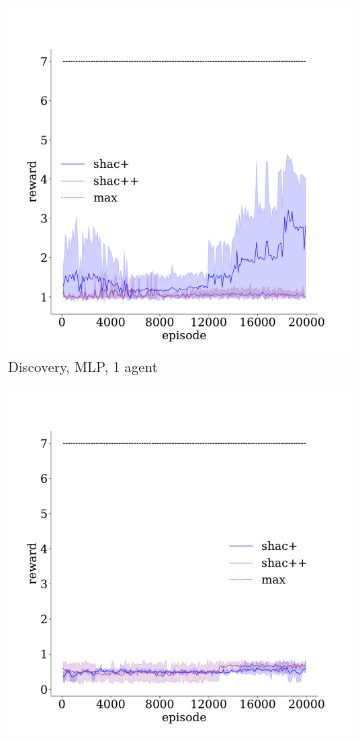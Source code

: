 \begin{figure}[!t]
    \begin{subfigure}[b]{0.32\textwidth}
        \includegraphics[width=\textwidth]{figs/discovery-ablation-1-mlp.pdf}
        \caption{Discovery, MLP, 1 agent}
        \label{fig:discovery-ablation-mlp-1}
    \end{subfigure}
    \begin{subfigure}[b]{0.32\textwidth}
        \includegraphics[width=\textwidth]{figs/discovery-ablation-3-mlp.pdf}

\end{subfigure}
\end{figure}

